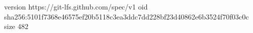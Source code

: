 version https://git-lfs.github.com/spec/v1
oid sha256:5101f7368e46575ef20b5118c3ea3ddc7dd228bf23d40862e6b3524f70f03c0c
size 482
